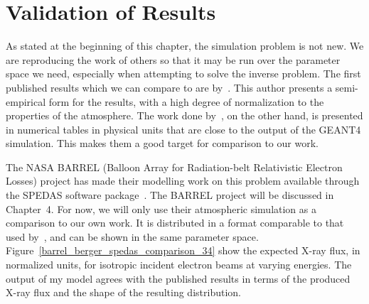 \section{Validation of Results}

 As stated at the beginning of this chapter, the simulation problem is not new. We are reproducing the work of others so that it may be run over the parameter space we need, especially when attempting to solve the inverse problem. The first published results which we can compare to are by~\citet{Rees1963}. This author presents a semi-empirical form for the results, with a high degree of normalization to the properties of the atmosphere. The work done by~\cite{Berger1972}, on the other hand, is presented in numerical tables in physical units that are close to the output of the GEANT4 simulation. This makes them a good target for comparison to our work. 

The NASA BARREL (Balloon Array for Radiation-belt Relativistic Electron Losses) project has made their modelling work on this problem available through the SPEDAS software package~\citep{Angelopoulos2019}. The BARREL project will be discussed in Chapter~4. For now, we will only use their atmospheric simulation as a comparison to our own work. It is distributed in a format comparable to that used by~\cite{Berger1972}, and can be shown in the same parameter space. Figure~\ref{barrel_berger_spedas_comparison_34} show the expected X-ray flux, in normalized units, for isotropic incident electron beams at varying energies. The output of my model agrees with the published results in terms of the produced X-ray flux and the shape of the resulting distribution. 

